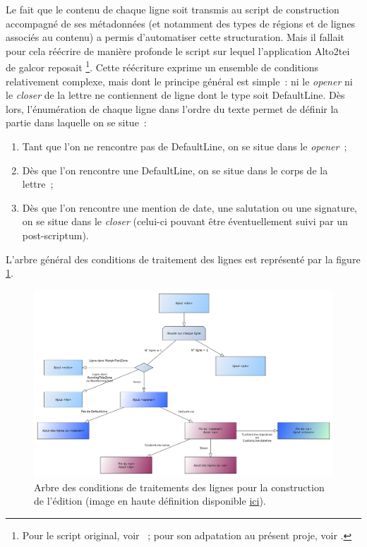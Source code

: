 \documentclass[a4paper,12pt,twoside]{book}
\begin{document}
			Le fait que le contenu de chaque ligne soit transmis au script de construction accompagné de ses métadonnées (et notamment des types de régions et de lignes associés au contenu) a permis d'automatiser cette structuration. Mais il fallait pour cela réécrire de manière profonde le script sur lequel l'application Alto2tei de \gls{galcor} reposait%
			\footnote{Pour le script original, voir \cite{christensenBodyBuildPy2022}~; pour son adpatation au présent proje, voir \cite{biayBuildBodyPy2022}.}.
			Cette réécriture exprime un ensemble de conditions relativement complexe, mais dont le principe général est simple~: ni le \textit{opener} ni le \textit{closer} de la lettre ne contiennent de ligne dont le type soit \textsf{DefaultLine}. Dès lors, l'énumération de chaque ligne dans l'ordre du texte permet de définir la partie dans laquelle on se situe~:
			
			\begin{enumerate}
				\item Tant que l'on ne rencontre pas de \textsf{DefaultLine}, on se situe dans le \textit{opener}~;
				\item Dès que l'on rencontre une \textsf{DefaultLine}, on se situe dans le corps de la lettre~;
				\item Dès que l'on rencontre une mention de date, une salutation ou une signature, on se situe dans le \textit{closer} (celui-ci pouvant être éventuellement suivi par un post-scriptum).
			\end{enumerate}
		
			L'arbre général des conditions de traitement des lignes est représenté par la figure \ref{cond-body}.
			
			\begin{figure}[!h]
				\centering
				\includegraphics[width=15cm]{schema/build-body.png}
				\caption{Arbre des conditions de traitements des lignes pour la construction de l'édition (image en haute définition disponible \href{https://raw.githubusercontent.com/sbiay/CdS-edition/main/documentation/schema/build-body.svg}{ici}).}
				\label{cond-body}
			\end{figure}
		
\end{document}
